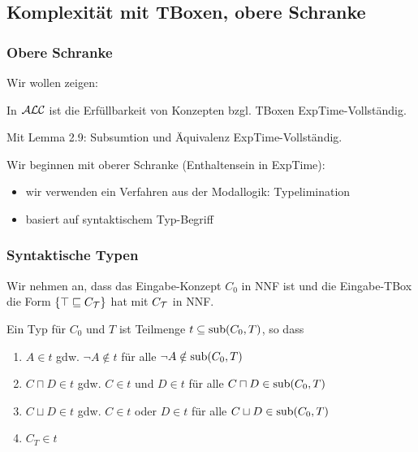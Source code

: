 \subsection{Komplexität mit TBoxen, obere
Schranke}\label{komplexituxe4t-mit-tboxen-obere-schranke}

\subsubsection{Obere Schranke}

Wir wollen zeigen:

\begin{theorem}
In $\mathcal{A}\mathcal{L}\mathcal{C}$ ist die Erfüllbarkeit von Konzepten bzgl. TBoxen
ExpTime-Vollständig.
\end{theorem}

Mit Lemma 2.9: Subsumtion und Äquivalenz ExpTime-Vollständig.

Wir beginnen mit oberer Schranke (Enthaltensein in ExpTime):

\begin{itemize}
  \item wir verwenden ein Verfahren aus der Modallogik: Typelimination
  \item basiert auf syntaktischem Typ-Begriff
\end{itemize}

\subsubsection{Syntaktische Typen}\label{synt-typ}

Wir nehmen an, dass das Eingabe-Konzept $C_0$ in NNF ist und die Eingabe-TBox die Form $\{\top \sqsubseteq C_{\mathcal{T}}\}$ hat mit $C_{\mathcal{T}}$ in NNF.

\begin{definition}[Typ]

Ein Typ für $C_{0}$ und $T$ ist Teilmenge
$t \subseteq \sub\left( C_{0},T \right)$, so dass

\begin{enumerate}
\def\labelenumi{\arabic{enumi}.}
\item
  $A \in t$ gdw. $\neg A \notin t$ für alle
  $\neg A \notin \sub\left( C_{0},T \right)$
\item
  $C \sqcap D \in t$ gdw. $C \in t$ und $D \in t$ für alle
  $C \sqcap D \in \sub\left( C_{0},T \right)$
\item
  $C \sqcup D \in t$ gdw. $C \in t$ oder $D \in t$ für alle
  $C \sqcup D \in \sub\left( C_{0},T \right)$
\item
  $C_{T} \in t$
\end{enumerate}
\end{definition}

